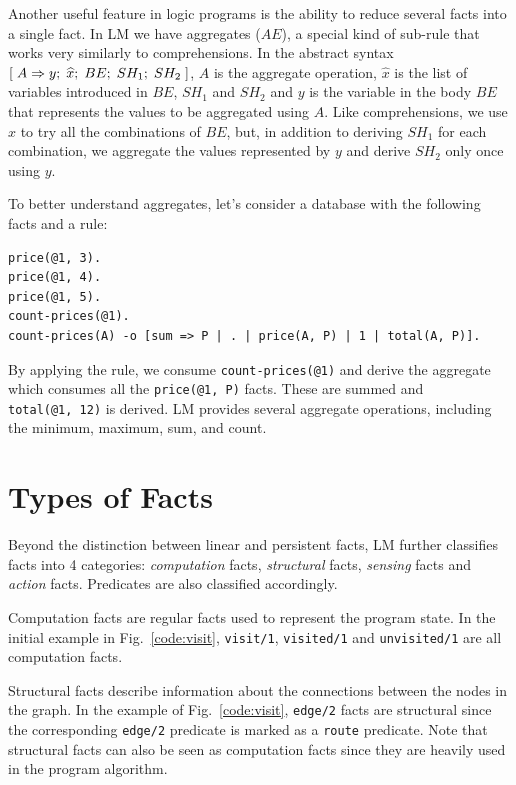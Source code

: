 Another useful feature in logic programs is the ability to reduce several facts into a single fact.
In LM we have aggregates ($AE$), a special kind of sub-rule that works very similarly to comprehensions.
In the abstract syntax $[\; A \Rightarrow y; \; \widehat{x}; \; BE; \; SH_1; \; SH_2 \;]$, $A$ is the aggregate operation, $\widehat{x}$ is the list of variables
introduced in $BE$, $SH_1$ and $SH_2$ and $y$ is the variable in the body
$BE$ that represents the values to be aggregated using $A$. Like comprehensions,
we use $\widehat{x}$ to try all the combinations of $BE$, but, in addition to deriving $SH_1$ for each combination,
we aggregate the values represented by $y$ and derive $SH_2$ only once using $y$.

To better understand aggregates, let's consider a database with the following facts and a rule:

\begin{Verbatim}
price(@1, 3).
price(@1, 4).
price(@1, 5).
count-prices(@1).
count-prices(A) -o [sum => P | . | price(A, P) | 1 | total(A, P)].
\end{Verbatim}

By applying the rule, we consume \texttt{count-prices(@1)} and
derive the aggregate which consumes all the \texttt{price(@1, P)} facts.
These are summed and \texttt{total(@1,~12)} is derived.  
LM provides several aggregate operations, including the minimum, maximum, sum, and count.

\section{Types of Facts}

Beyond the distinction between linear and persistent facts, LM further classifies facts
into 4 categories: \emph{computation} facts, \emph{structural} facts, \emph{sensing} facts
and \emph{action} facts. Predicates are also classified accordingly.

Computation facts are regular facts used to represent the program state. In the initial
example in Fig.~\ref{code:visit}, \texttt{visit/1}, \texttt{visited/1} and \texttt{unvisited/1}
are all computation facts.

Structural facts describe information about the connections between the nodes in the graph.
In the example of Fig.~\ref{code:visit}, \texttt{edge/2} facts are structural since the
corresponding \texttt{edge/2} predicate is
marked as a \texttt{route} predicate. Note that structural facts can also be seen as
computation facts since they are heavily used in the program algorithm.

